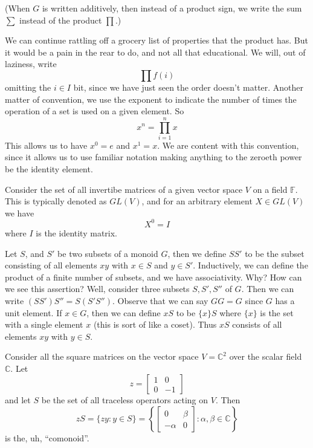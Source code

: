 (When $G$ is written additively, then instead of a product
sign, we write the sum $\sum$ instead of the product $\prod$.)

We can continue rattling off a grocery list of properties
that the product has. But it would be a pain in the rear to
do, and not all that educational. 
We will, out of laziness, write
\begin{equation}
\prod f(i)
\end{equation}
omitting the $i\in I$ bit, since we have just seen the order
doesn't matter. Another matter of convention, we use the
exponent to indicate the number of times the operation of a
set is used on a given element. So
\begin{equation*}
x^n = \prod^{n}_{i=1}x
\end{equation*}
This allows us to have $x^0=e$ and $x^1=x$. We are content
with this convention, since it allows us to use familiar
notation making anything to the zeroeth power be the
identity element.

\begin{ex}
Consider the set of all invertibe matrices of a given vector
space $V$ on a field $\mathbb{F}$. This is typically denoted
as $GL(V)$, and for an arbitrary element $X\in GL(V)$ we
have
\begin{equation}
X^0 = I
\end{equation}
where $I$ is the identity matrix. \qef
\end{ex}

Let $S$, and $S'$ be two subsets of a monoid $G$, then we
define $SS'$ to be the subset consisting of all elements
$xy$ with $x\in S$ and $y\in S'$. Inductively, we can define
the product of a finite number of subsets, and we have
associativity. Why? How can we see this assertion? Well,
consider three subsets $S,S',S''$ of $G$. Then we can write
$(SS')S''=S(S'S'')$. Observe that we can say $GG=G$ since
$G$ has a unit element. If $x\in G$, then we can define $xS$
to be $\{x\}S$ where $\{x\}$ is the set with a single
element $x$ (this is sort of like a coset). Thus $xS$
consists of all elements $xy$ with $y\in S$.

\begin{ex}
Consider all the square matrices on the vector space
$V=\mathbb{C}^2$ over the scalar field $\mathbb{C}$. Let 
\begin{equation}
z = \begin{bmatrix}1&0\\0&-1\end{bmatrix}
\end{equation}
and let $S$ be the set of all traceless operators acting on
$V$. Then
\begin{equation}
zS = \{ zy:y\in S\} = \left\{\begin{bmatrix}0&\beta\\-\alpha&0\end{bmatrix}:\alpha,\beta\in\mathbb{C} \right\}
\end{equation}
is the, uh, ``comonoid''.\qef
\end{ex}

